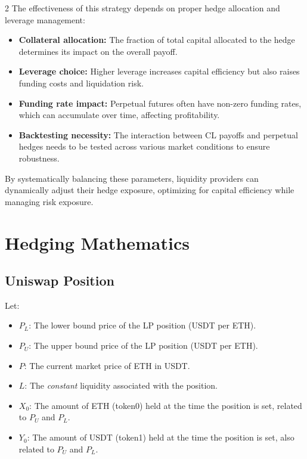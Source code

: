 \documentclass[12pt]{article}
\begin{document}
\begin{multicols}{2}
The effectiveness of this strategy depends on proper hedge allocation and leverage management:
\begin{itemize}
    \item \textbf{Collateral allocation:} The fraction of total capital allocated to the hedge determines its impact on the overall payoff.
    \item \textbf{Leverage choice:} Higher leverage increases capital efficiency but also raises funding costs and liquidation risk.
    \item \textbf{Funding rate impact:} Perpetual futures often have non-zero funding rates, which can accumulate over time, affecting profitability.
    \item \textbf{Backtesting necessity:} The interaction between CL payoffs and perpetual hedges needs to be tested across various market conditions to ensure robustness.
\end{itemize}

By systematically balancing these parameters, liquidity providers can dynamically adjust their hedge exposure, optimizing for capital efficiency while managing risk exposure.

\newpage

\section{Hedging Mathematics}

\subsection{Uniswap Position}
Let:

\begin{itemize}
	\item \textbf{$P_L$}: The lower bound price of the LP position (USDT per ETH).
	\item \textbf{$P_U$}: The upper bound price of the LP position (USDT per ETH).
	\item \textbf{$P$}: The current market price of ETH in USDT.
	\item \textbf{$L$}: The \emph{constant} liquidity associated with the position.
	\item \textbf{$X_0$}: The amount of ETH (token0) held at the time the position is set, related to $P_U$ and $P_L$.
	\item \textbf{$Y_0$}: The amount of USDT (token1) held at the time the position is set, also related to $P_U$ and $P_L$.
\end{itemize}


\end{multicols}
\end{document}
